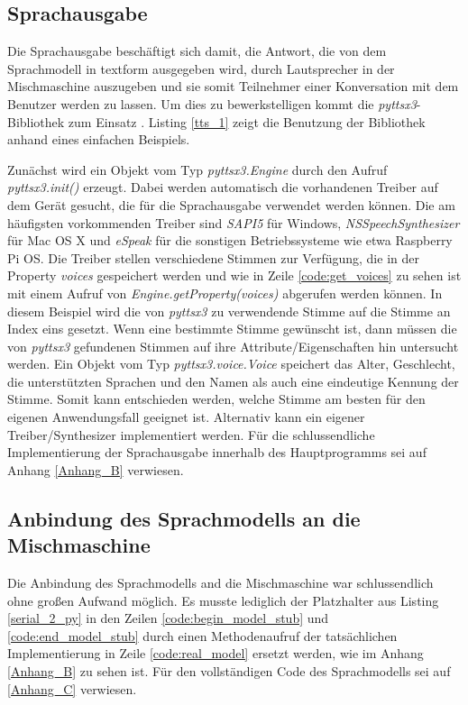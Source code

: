 \subsection{Sprachausgabe} 
Die Sprachausgabe beschäftigt sich damit, die Antwort, die von dem Sprachmodell in textform ausgegeben wird, durch Lautsprecher in der Mischmaschine auszugeben und sie somit Teilnehmer einer Konversation mit dem Benutzer werden zu lassen. Um dies zu bewerkstelligen kommt die \textit{pyttsx3}-Bibliothek zum Einsatz \cite{pyttsx3}. Listing \ref{tts_1} zeigt die Benutzung der Bibliothek anhand eines einfachen Beispiels.

Zunächst wird ein Objekt vom Typ \textit{pyttsx3.Engine} durch den Aufruf \textit{pyttsx3.init()} erzeugt. Dabei werden automatisch die vorhandenen Treiber auf dem Gerät gesucht, die für die Sprachausgabe verwendet werden können. Die am häufigsten vorkommenden Treiber sind \textit{SAPI5} für Windows, \textit{NSSpeechSynthesizer} für Mac OS X und \textit{eSpeak} für die sonstigen Betriebssysteme wie etwa Raspberry Pi OS. Die Treiber stellen verschiedene \glqq{}Stimmen\grqq{} zur Verfügung, die in der Property \textit{voices} gespeichert werden und wie in Zeile \ref{code:get_voices} zu sehen ist mit einem Aufruf von \textit{Engine.getProperty(\glqq{}voices\grqq{})} abgerufen werden können. In diesem Beispiel wird die von \textit{pyttsx3} zu verwendende Stimme auf die Stimme an Index eins gesetzt. Wenn eine bestimmte Stimme gewünscht ist, dann müssen die von \textit{pyttsx3} gefundenen Stimmen auf ihre Attribute/Eigenschaften hin untersucht werden. Ein Objekt vom Typ \textit{pyttsx3.voice.Voice} speichert das Alter, Geschlecht, die unterstützten Sprachen und den Namen als auch eine eindeutige Kennung der Stimme. Somit kann entschieden werden, welche Stimme am besten für den eigenen Anwendungsfall geeignet ist. Alternativ kann ein eigener Treiber/Synthesizer implementiert werden. Für die schlussendliche Implementierung der Sprachausgabe innerhalb des Hauptprogramms sei auf Anhang \ref{Anhang_B} verwiesen.
\subsection{Anbindung des Sprachmodells an die Mischmaschine}
Die Anbindung des Sprachmodells and die Mischmaschine war schlussendlich ohne großen Aufwand möglich. Es musste lediglich der Platzhalter aus Listing \ref{serial_2_py} in den Zeilen \ref{code:begin_model_stub} und \ref{code:end_model_stub} durch einen Methodenaufruf der tatsächlichen Implementierung in Zeile \ref{code:real_model} ersetzt werden, wie im Anhang \ref{Anhang_B} zu sehen ist. Für den vollständigen Code des Sprachmodells sei auf \ref{Anhang_C} verwiesen.   
\endinput


